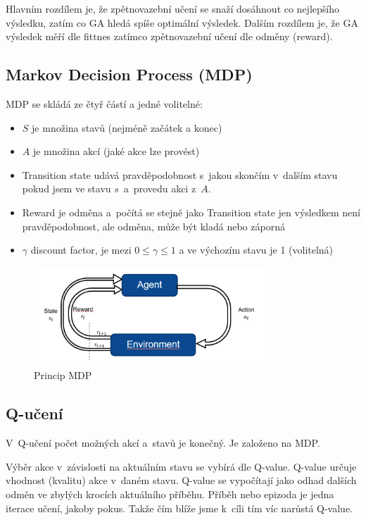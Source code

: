 Hlavním rozdílem je, že zpětnovazební učení se snaží dosáhnout co nejlepšího výsledku, zatím co GA hledá spíše optimální výsledek.
Dalším rozdílem je, že GA výsledek měří dle fittnes zatímco zpětnovazební učení dle odměny (reward).

\subsection{Markov Decision Process (MDP)}

MDP se skládá ze čtyř částí a jedné volitelné:
\begin{itemize}
	\item $S$ je množina stavů (nejméně začátek a konec)
	\item $A$ je množina akcí (jaké akce lze provést)
	\item Transition state udává pravděpodobnost s~jakou skončím v~dalším stavu pokud jsem ve stavu $s$~a~provedu akci z~$A$. 
	\item Reward je odměna a~počítá se stejně jako Transition state jen výsledkem není pravděpodobnost, ale odměna, může být kladá nebo záporná
	\item $\gamma$ discount factor, je mezi $0 \leq \gamma \leq 1$ a ve výchozím stavu je 1 (volitelná)
\end{itemize}

\begin{figure}[h]
    \centering
	\includegraphics[height=10em]{images/10_MDP.png}
    \caption{Princip MDP}
    \label{mdp}
\end{figure}

\subsection{Q-učení}

V~Q-učení počet možných akcí a~stavů je konečný.
Je založeno na MDP.

Výběr akce v~závislosti na aktuálním stavu se vybírá dle Q-value.
Q-value určuje vhodnost (kvalitu) akce v~daném stavu.
Q-value se vypočítají jako odhad dalších odměn ve zbylých krocích aktuálního příběhu.
Příběh nebo epizoda je jedna iterace učení, jakoby pokus.
Takže čím blíže jsme k~cíli tím víc narůstá Q-value.

